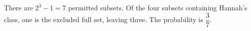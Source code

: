 There are $2^3-1=7$ permitted subsets. Of the four subsets containing Hannah's class, one is the excluded full set, leaving three. The probability is $\boxed{\dfrac{3}{7}}$.
